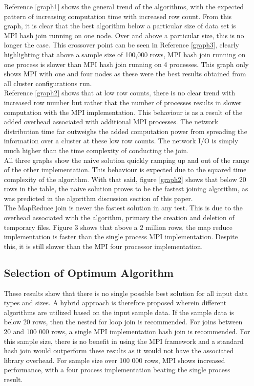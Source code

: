 \documentclass[10.5 pt, conference]{IEEEtran}
\begin{document}
Reference \ref{graph1} shows the general trend of the algorithms, with the expected pattern of increasing computation time with increased row count. From this graph, it is clear that the best algorithm below a particular size of data set is MPI hash join running on one node. Over and above a particular size, this is no longer the case. This crossover point can be seen in Reference \ref{graph3}, clearly highlighting that above a sample size of 100,000 rows, MPI hash join running on one process is slower than MPI hash join running on 4 processes. This graph only shows MPI with one and four nodes as these were the best results obtained from all cluster configurations run.\\

Reference \ref{graph2} shows that at low row counts, there is no clear trend with increased row number but rather that the number of processes results in slower computation with the MPI implementation. This behaviour is as a result of the added overhead associated with additional MPI processes. The network distribution time far outweighs the added computation power from spreading the information over a cluster at these low row counts. The network I/O is simply much higher than the time complexity of conducting the join.\\

All three graphs show the naive solution quickly ramping up and out of the range of the other implementation. This behaviour is expected due to the squared time complexity of the algorithm. With that said, figure \ref{graph2} shows that below 20 rows in the table, the naive solution proves to be the fastest joining algorithm, as was predicted in the algorithm discussion section of this paper.\\

The MapReduce join is never the fastest solution in any test. This is due to the overhead associated with the algorithm, primary the creation and deletion of temporary files. Figure 3 shows that above a 2 million rows, the map reduce implementation is faster than the single process MPI implementation. Despite this, it is still slower than the MPI four processor implementation. 

\subsection{Selection of Optimum Algorithm}
These results show that there is no single possible best solution for all input data types and sizes. A hybrid approach is therefore proposed wherein different algorithms are utilized based on the input sample data. If the sample data is below 20 rows, then the nested for loop join is recommended. For joins between 20 and 100 000 rows, a single MPI implementation hash join is recommended. For this sample size, there is no benefit in using the MPI framework and a standard hash join would outperform these results as it would not have the associated library overhead. For sample size over 100 000 rows, MPI shows increased performance, with a four process implementation beating the single process result. \\
\end{document}
